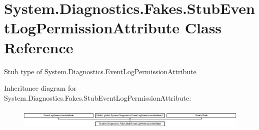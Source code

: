 \hypertarget{class_system_1_1_diagnostics_1_1_fakes_1_1_stub_event_log_permission_attribute}{\section{System.\-Diagnostics.\-Fakes.\-Stub\-Event\-Log\-Permission\-Attribute Class Reference}
\label{class_system_1_1_diagnostics_1_1_fakes_1_1_stub_event_log_permission_attribute}
}


Stub type of System.\-Diagnostics.\-Event\-Log\-Permission\-Attribute 


Inheritance diagram for System.\-Diagnostics.\-Fakes.\-Stub\-Event\-Log\-Permission\-Attribute\-:\begin{figure}[H]
\begin{center}
\leavevmode
\includegraphics[height=0.972222cm]{class_system_1_1_diagnostics_1_1_fakes_1_1_stub_event_log_permission_attribute}
\end{center}
\end{figure}
